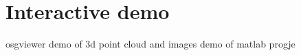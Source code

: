 \documentclass{beamer}
\begin{document}
%
%
%
%
%
%
%
%
%
%
%
%









\section{Interactive demo}
	osgviewer demo of 3d point cloud and images
	demo of matlab progje
\end{document}
